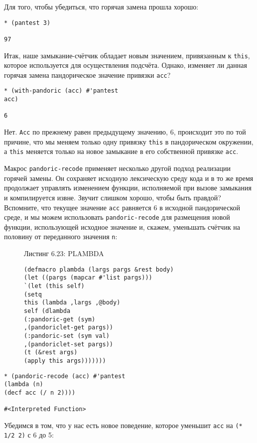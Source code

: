 Для того, чтобы убедиться, что горячая замена прошла хорошо:

\begin{verbatim}
* (pantest 3)

97
\end{verbatim}

Итак, наше замыкание-счётчик обладает новым значением, привязанным к \verb"this", которое используется для осуществления подсчёта. Однако, изменяет ли данная горячая замена пандорическое значение привязки \verb"acc"?

\begin{verbatim}
* (with-pandoric (acc) #'pantest
acc)

6
\end{verbatim}

Нет. \verb"Acc" по прежнему равен предыдущему значению, 6, происходит это по той причине, что мы меняем только одну привязку \verb"this" в пандорическом окружении, а \verb"this" меняется только на новое замыкание в его собственной привязке \verb"acc".

Макрос \verb"pandoric-recode" применяет несколько другой подход реализации горячей замены. Он сохраняет исходную лексическую среду кода и в то же время продолжает управлять изменением функции, исполняемой при вызове замыкания и компилируется извне. Звучит слишком хорошо, чтобы быть правдой? Вспомните, что текущее значение \verb"acc" равняется 6 в исходной пандорической среде, и мы можем использовать \verb"pandoric-recode" для размещения новой функции, использующей исходное значение и, скажем, уменьшать счётчик на половину от переданного значения \verb"n":

\begin{figure}Листинг 6.23: PLAMBDA\label{listing_6.23}
\listbegin
\begin{verbatim}
(defmacro plambda (largs pargs &rest body)
(let ((pargs (mapcar #'list pargs)))
`(let (this self)
(setq
this (lambda ,largs ,@body)
self (dlambda
(:pandoric-get (sym)
,(pandoriclet-get pargs))
(:pandoric-set (sym val)
,(pandoriclet-set pargs))
(t (&rest args)
(apply this args)))))))
\end{verbatim}
\listend
\end{figure}

\begin{verbatim}
* (pandoric-recode (acc) #'pantest
(lambda (n)
(decf acc (/ n 2))))

#<Interpreted Function>
\end{verbatim}

Убедимся в том, что у нас есть новое поведение, которое уменьшит \verb"acc" на \verb"(* 1/2 2)" с 6 до 5:

